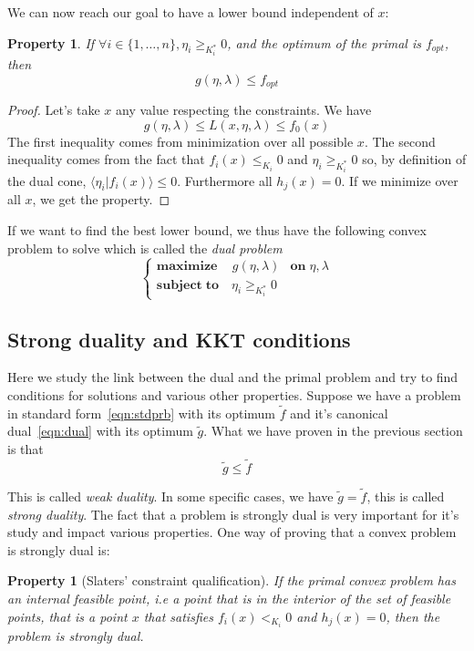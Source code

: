 \documentclass[10pt,a4paper]{report}
\theoremstyle{plain}
\newtheorem{prop}[thm]{Property}
\theoremstyle{definition}
\theoremstyle{remark}
\newcommand{\braket}[2]{\langle#1|#2\rangle}
\renewcommand{\geq}{\geqslant}
\renewcommand{\leq}{\leqslant}
\newcommand{\maxim}[3]{\begin{cases}
    \mathbf{maximize}\,\quad #1& \mathbf{on}\; #2\\
    \mathbf{subject\;to}\quad #3
  \end{cases}}
\begin{document}
We can now reach our goal to have a lower bound independent of $x$:

\begin{prop}
  If $\forall i \in \{1,\ldots,n\}, \eta_i \geq_{K_i^*} 0$, and the optimum of the primal is
  $f_{opt}$, then
  \[g(\eta,\lambda) \leq f_{opt}\]
\end{prop}

\begin{proof}
  Let's take $x$ any value respecting the constraints. We have
  \[g(\eta,\lambda) \le L(x,\eta,\lambda) \le f_0(x)\]
  The first inequality comes from minimization over all possible $x$.
  The second inequality comes from the fact that $f_i(x) \leq_{K_i} 0$ and
  $\eta_i \geq_{K_i^*} 0$ so, by definition of the dual cone, $\braket
  {\eta_i}{f_i(x)} \leq 0$. Furthermore all $h_j(x) = 0$. If we minimize over
  all $x$, we get the property.
\end{proof}

If we want to find the best lower bound, we thus have the following convex
problem to solve which is called the \emph{dual problem}
\begin{equation}\label{eqn:dual}
\maxim{g(\eta,\lambda)}{\eta,\lambda}{\eta_i \geq_{K_i^*} 0}
\end{equation}

\subsection{Strong duality and KKT conditions}

Here we study the link between the dual and the primal problem and try to find
conditions for solutions and various other properties. Suppose we have a problem in
standard form~\ref{eqn:stdprb} with its optimum $\tilde f$ and it's canonical
dual~\ref{eqn:dual} with its optimum $\tilde g$. What we have proven in the
previous section is that
\[\tilde g \leq \tilde f\]

This is called \emph{weak duality}. In some specific cases, we have $\tilde g =
\tilde f$, this is called \emph{strong duality}. The fact that a problem is
strongly dual is very important for it's study and impact various properties.
One way of proving that a convex problem is strongly dual is:
\begin{prop}[Slaters' constraint qualification]\label{prop:slater}
  If the primal convex problem has an internal feasible point, i.e a point that is in
  the interior of the set of feasible points, that is a point $x$ that satisfies
  $f_i(x) <_{K_i} 0$ and $h_j(x) = 0$, then the problem is strongly dual.
\end{prop}
\end{document}
